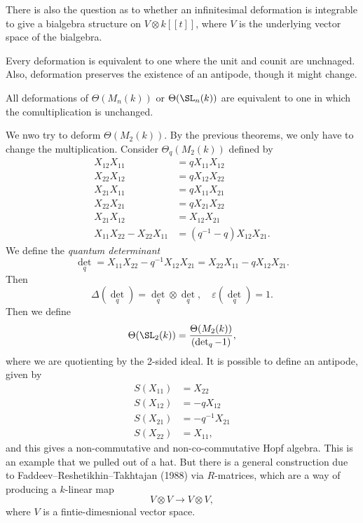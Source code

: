 \documentclass[a4paper]{article}
\begin{document}
There is also the question as to whether an infinitesimal deformation is integrable to give a bialgebra structure on $V \otimes k[[t]]$, where $V$ is the underlying vector space of the bialgebra.

\begin{thm}
  Every deformation is equivalent to one where the unit and counit are unchnaged. Also, deformation preserves the existence of an antipode, though it might change.
\end{thm}

\begin{thm}
  All deformations of $\Theta(M_n(k))$ or $\Theta(\SL_n(k))$ are equivalent to one in which the comultiplication is unchanged.
\end{thm}

We nwo try to deform $\Theta(M_2(k))$. By the previous theorems, we only have to change the multiplication. Consider $\Theta_q(M_2(k))$ defined by
\begin{align*}
  X_{12} X_{11} &= q X_{11} X_{12}\\
  X_{22} X_{12} &= q X_{12} X_{22}\\
  X_{21} X_{11} &= q X_{11} X_{21}\\
  X_{22} X_{21} &= q X_{21} X_{22}\\
  X_{21} X_{12} &= X_{12} X_{21}\\
  X_{11} X_{22} - X_{22} X_{11} &= (q^{-1} - q) X_{12} X_{21}.
\end{align*}
We define the \emph{quantum determinant}
\[
  \det_q = X_{11} X_{22} - q^{-1} X_{12} X_{21} = X_{22} X_{11} - q X_{12} X_{21}.
\]
Then
\[
  \Delta(\det_q) = \det_q \otimes \det_q,\quad \varepsilon (\det_q) = 1.
\]
Then we define
\[
  \Theta(\SL_2(k)) = \frac{\Theta(M_2(k))}{(\det_q - 1)},
\]
where we are quotienting by the 2-sided ideal. It is possible to define an antipode, given by
\begin{align*}
  S(X_{11}) &= X_{22}\\
  S(X_{12}) &= -q X_{12}\\
  S(X_{21}) &= -q^{-1} X_{21}\\
  S(X_{22}) &= X_{11},
\end{align*}
and this gives a non-commutative and non-co-commutative Hopf algebra. This is an example that we pulled out of a hat. But there is a general construction due to Faddeev--Reshetikhin--Takhtajan (1988) via $R$-matrices, which are a way of producing a $k$-linear map
\[
  V \otimes V \to V \otimes V,
\]
where $V$ is a fintie-dimesnional vector space.
\end{document}

